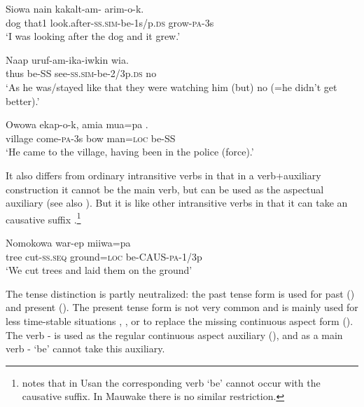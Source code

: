 \ea%
\label{ex:3:x1931}
\gll Siowa nain kakalt-am-\textstyleEmphasizedVernacularWords{-} arim-o-k. \\
dog that1 look.after-\textsc{ss}.\textsc{sim}-be-1s/p.\textsc{ds} grow-\textsc{pa}-3s\\
\glt`I was looking after the dog and it grew.'
\z

\ea%
\label{ex:3:x260}
\gll Naap  uruf-am-ika-iwkin wia. \\
thus be-SS see-\textsc{ss}.\textsc{sim}-be-2/3p.\textsc{ds} no\\
\glt`As he was/stayed like that they were watching him (but) no (=he didn't get better).' 
\z

\ea%
\label{ex:3:x262}
\gll Owowa ekap-o-k, amia mua=pa . \\
village come-\textsc{pa}-3s bow man=\textsc{loc} be-SS \\
\glt`He came to the village, having been in the police (force).'
\z

It also differs from ordinary intransitive verbs in that in a verb+auxiliary construction it cannot be the main verb, but can be used as the aspectual auxiliary  (see also ). But it is like other intransitive verbs in that it can take an causative suffix .\footnote{\citet[142]{Reesink1987} notes that in Usan the corresponding verb  `be' cannot occur with the causative suffix. In Mauwake there is no similar restriction.} 

\ea%
\label{ex:3:x261}
\gll Nomokowa war-ep miiwa=pa  \\
tree cut-\textsc{ss}.\textsc{seq} ground=\textsc{loc} be-CAUS-\textsc{pa}-1/3p\\
\glt`We cut trees and laid them on the ground' 
\z

The tense distinction is partly neutralized: the past tense form is used for past () and present (). The present tense form is not very common and is mainly used for less time-stable situations , , or to replace the missing continuous aspect form (). The verb - is used as the regular continuous aspect auxiliary (), and as a main verb - `be' cannot take this auxiliary. 

